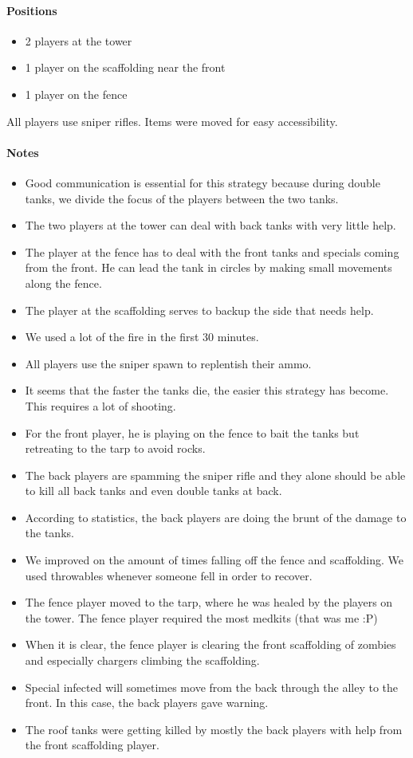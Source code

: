 \paragraph{Positions}
\begin{itemize}
\item 2 players at the tower
\item 1 player on the scaffolding near the front
\item 1 player on the fence
\end{itemize}
All players use sniper rifles. Items were moved for easy accessibility.

\paragraph{Notes}
\begin{itemize}
\item Good communication is essential for this strategy because during double tanks, we divide the focus of the players between the two tanks.
\item The two players at the tower can deal with back tanks with very little help.
\item The player at the fence has to deal with the front tanks and specials coming from the front. He can lead the tank in circles by making small movements along the fence.
\item The player at the scaffolding serves to backup the side that needs help.
\item We used a lot of the fire in the first 30 minutes.
\item All players use the sniper spawn to replentish their ammo.
\item It seems that the faster the tanks die, the easier this strategy has become. This requires a lot of shooting.
\item For the front player, he is playing on the fence to bait the tanks but retreating to the tarp to avoid rocks.
\item The back players are spamming the sniper rifle and they alone should be able to kill all back tanks and even double tanks at back.
\item According to statistics, the back players are doing the brunt of the damage to the tanks.
\item We improved on the amount of times falling off the fence and scaffolding. We used throwables whenever someone fell in order to recover.
\item The fence player moved to the tarp, where he was healed by the players on the tower. The fence player required the most medkits (that was me :P)
\item When it is clear, the fence player is clearing the front scaffolding of zombies and especially chargers climbing the scaffolding.
\item Special infected will sometimes move from the back through the alley to the front. In this case, the back players gave warning.
\item The roof tanks were getting killed by mostly the back players with help from the front scaffolding player.
\end{itemize}

